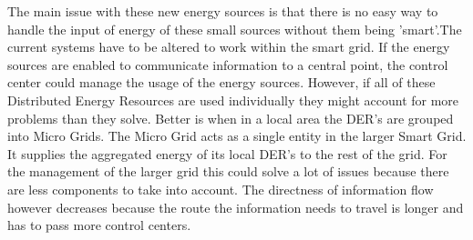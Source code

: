 The main issue with these new energy sources is that there is no easy way to handle the input of energy of these small sources without them being 'smart'.The current systems have to be altered to work within the smart grid. If the energy sources are enabled to communicate information to a central point, the control center could manage the usage of the energy sources. However, if all of these Distributed Energy Resources are used individually they might account for more problems than they solve. Better is when in a local area the DER's are grouped into Micro Grids. The Micro Grid acts as a single entity in the larger Smart Grid. It supplies the aggregated energy of its local DER's to the rest of the grid. For the management of the larger grid this could solve a lot of issues because there are less components to take into account. The directness of information flow however decreases because the route the information needs to travel is longer and has to pass more control centers. 